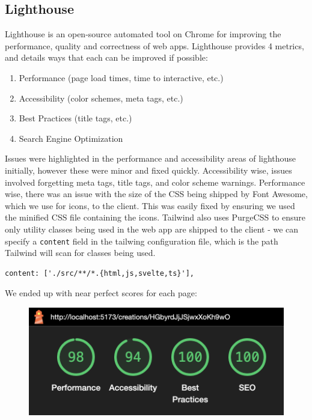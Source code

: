 \documentclass[12pt,a4paper]{article}
\begin{document}
\subsection{Lighthouse}
Lighthouse is an open-source automated tool on Chrome for improving the performance, quality and correctness of web apps. Lighthouse provides 4 metrics, and details ways that each can be improved if possible:
\begin{enumerate}
    \item Performance (page load times, time to interactive, etc.)
    \item Accessibility (color schemes, meta tags, etc.)
    \item Best Practices (title tags, etc.)
    \item Search Engine Optimization
\end{enumerate}
Issues were highlighted in the performance and accessibility areas of lighthouse initially, however these were minor and fixed quickly. Accessibility wise, issues involved forgetting meta tags, title tags, and color scheme warnings. Performance wise, there was an issue with the size of the CSS being shipped by Font Awesome, which we use for icons, to the client. This was easily fixed by ensuring we used the minified CSS file containing the icons. Tailwind also uses PurgeCSS to ensure only utility classes being used in the web app are shipped to the client - we can specify a \verb|content| field in the tailwing configuration file, which is the path Tailwind will scan for classes being used.
\begin{lstlisting}
content: ['./src/**/*.{html,js,svelte,ts}'],
\end{lstlisting}
We ended up with near perfect scores for each page:
\begin{figure}[H]
    \centering
    \includegraphics[scale=0.4]{l1.png}
\end{figure}
\end{document}
